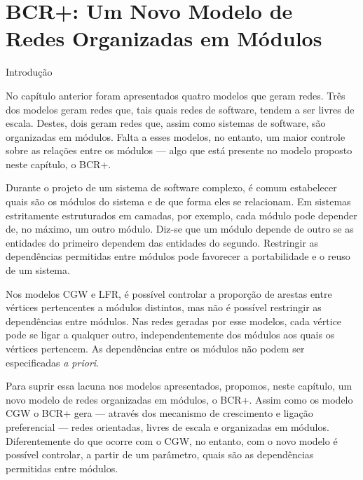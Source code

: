 \chapter{BCR+: Um Novo Modelo de Redes Organizadas em Módulos} \label{cap:bcr}

\begin{section}{Introdução}

No capítulo anterior foram apresentados quatro modelos que geram redes. Três dos modelos geram redes que, tais quais redes de software, tendem a ser livres de escala. Destes, dois geram redes que, assim como sistemas de software, são organizadas em módulos. Falta a esses modelos, no entanto, um maior controle sobre as relações entre os módulos --- algo que está presente no modelo proposto neste capítulo, o BCR+.

Durante o projeto de um sistema de software complexo, é comum estabelecer quais são os módulos do sistema e de que forma eles se relacionam. Em sistemas estritamente estruturados em camadas, por exemplo, cada módulo pode depender de, no máximo, um outro módulo. Diz-se que um módulo depende de outro se as entidades do primeiro dependem das entidades do segundo. Restringir as dependências permitidas entre módulos pode favorecer a portabilidade e o reuso de um sistema.

Nos modelos CGW e LFR, é possível controlar a proporção de arestas entre vértices pertencentes a módulos distintos, mas não é possível restringir as dependências entre módulos. Nas redes geradas por esse modelos, cada vértice pode se ligar a qualquer outro, independentemente dos módulos aos quais os vértices pertencem. As dependências entre os módulos não podem ser especificadas \emph{a priori}.

Para suprir essa lacuna nos modelos apresentados, propomos, neste capítulo, um novo modelo de redes organizadas em módulos, o BCR+. Assim como os modelo CGW o BCR+ gera --- através dos mecanismo de crescimento e ligação preferencial --- redes orientadas, livres de escala e organizadas em módulos. Diferentemente do que ocorre com o CGW, no entanto, com o novo modelo é possível controlar, a partir de um parâmetro, quais são as dependências permitidas entre módulos.

\end{section}

